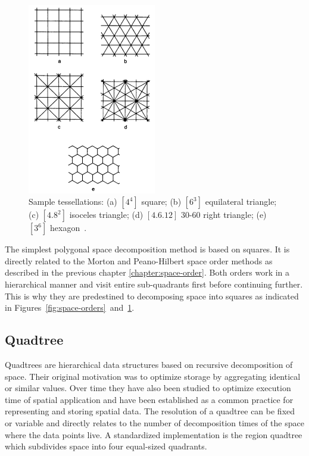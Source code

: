 \begin{figure}[h]
  \begin{center}
    \includegraphics[width=0.5\textwidth]{figures/space_decompositions.png}
    \caption{Sample tessellations: (a) $[4^4]$ square; (b) $[6^3]$ equilateral triangle; (c) $[4.8^2]$ isoceles triangle; (d) $[4.6.12]$ 30-60 right triangle; (e) $[3^6]$ hexagon~\cite[p 17]{Samet90spatialdata}.}
    \label{fig:space-decompositions}
  \end{center}
\end{figure}

The simplest polygonal space decomposition method is based on squares. It is directly related to the Morton and Peano-Hilbert space order methods as described in the previous chapter \ref{chapter:space-order}. Both orders work in a hierarchical manner and visit entire sub-quadrants first before continuing further. This is why they are predestined to decomposing space into squares as indicated in Figures~\ref{fig:space-orders}~and~\ref{fig:space-decompositions}.

\subsection{Quadtree}

Quadtrees are hierarchical data structures based on recursive decomposition of space. Their original motivation was to optimize storage by aggregating identical or similar values. Over time they have also been studied to optimize execution time of spatial application and have been established as a common practice for representing and storing spatial data. The resolution of a quadtree can be fixed or variable and directly relates to the number of decomposition times of the space where the data points live. A standardized implementation is the region quadtree which subdivides space into four equal-sized quadrants.

